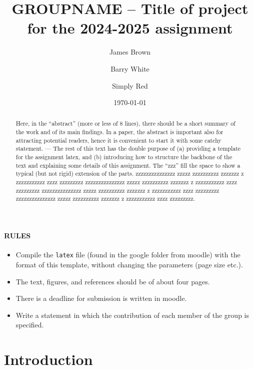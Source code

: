 \documentclass[prl,twocolumn]{revtex4-1}
\begin{document}
\title{GROUPNAME -- Title of project for the 2024-2025 assignment}





\author{James Brown}
\author{Barry White}
\author{Simply Red}

\date{\today}


\begin{abstract}
  Here, in the ``abstract'' (more or less of 8 lines), there should be a short summary of the work and of its main findings. In a paper, the abstract is important also for attracting potential readers, hence it is convenient to start it with some catchy statement. ---
 The rest of this text has the double purpose of (a) providing a template for the assignment latex, and (b) introducing how to structure the backbone of the text and explaining some details of this assignment. The ``zzz'' fill the space to show a typical (but not rigid) extension of the parts.
  zzzzzzzzzzzzzzz zzzzz zzzzzzzzzz zzzzzzz z zzzzzzzzzzz zzzz zzzzzzzzz
  zzzzzzzzzzzzzzz zzzzz zzzzzzzzzz zzzzzzz z zzzzzzzzzzz zzzz zzzzzzzzz
  zzzzzzzzzzzzzzz zzzzz zzzzzzzzzz zzzzzzz z zzzzzzzzzzz zzzz zzzzzzzzz
  zzzzzzzzzzzzzzz zzzzz zzzzzzzzzz zzzzzzz z zzzzzzzzzzz zzzz zzzzzzzzz.
\end{abstract}

\maketitle


\paragraph{\bf RULES}
{
\bf
\begin{itemize}
\item Compile the {\tt latex} file (found in the google folder from moodle) with the format of this template,  without changing the parameters (page size etc.).
\item The text, figures, and references should be of about four pages.
\item There is a deadline for submission is written in moodle.
\item Write a statement in which the contribution of each member of the group is specified.
\end{itemize}
}

\section{Introduction}
\end{document}
